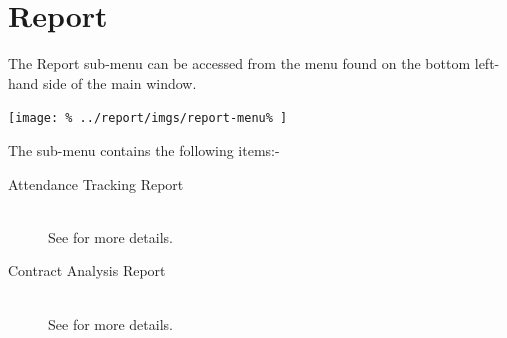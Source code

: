 \documentclass[../main/main]{subfiles}
\begin{document}
\newpage
\chapter{Report}
The Report sub-menu can be accessed from the menu found on the bottom
left-hand side of the main window.

\texttt{[image: \%
  ../report/imgs/report-menu\%
]}

The sub-menu contains the following items:-
\begin{description}
\item[Attendance Tracking Report] \hfill \\
See  for more details.
\item[Contract Analysis Report] \hfill \\
See  for more details.
\end{description}



\end{document}
